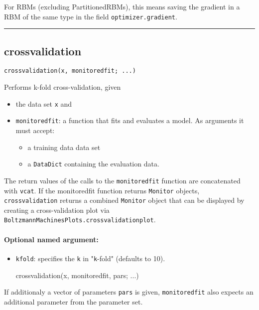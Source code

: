 For RBMs (excluding PartitionedRBMs), this means saving the gradient in a RBM of the same type in the field \texttt{optimizer.gradient}.

\noindent\rule{\textwidth}{1pt}
\subsection*{crossvalidation}  \label{bms_crossvalidation}
\begin{verbatim}
crossvalidation(x, monitoredfit; ...)
\end{verbatim}
Performs k-fold cross-validation, given

\begin{itemize}
\item the data set \texttt{x} and


\item \texttt{monitoredfit}: a function that fits and evaluates a model. As arguments it must accept:

\begin{itemize}
\item a training data data set


\item a \texttt{DataDict} containing the evaluation data.

\end{itemize}
\end{itemize}
The return values of the calls to the \texttt{monitoredfit} function are concatenated with \texttt{vcat}. If the monitoredfit function returns \texttt{Monitor} objects, \texttt{crossvalidation} returns a combined \texttt{Monitor} object that can be displayed by creating a cross-validation plot via \texttt{BoltzmannMachinesPlots.crossvalidationplot}.

\paragraph*{Optional named argument:}
\begin{itemize}
\item \texttt{kfold}: specifies the \texttt{k} in "\texttt{k}-fold" (defaults to 10).

crossvalidation(x, monitoredfit, pars; ...)

\end{itemize}
If additionaly a vector of parameters \texttt{pars} is given, \texttt{monitoredfit} also expects an additional parameter from the parameter set.

